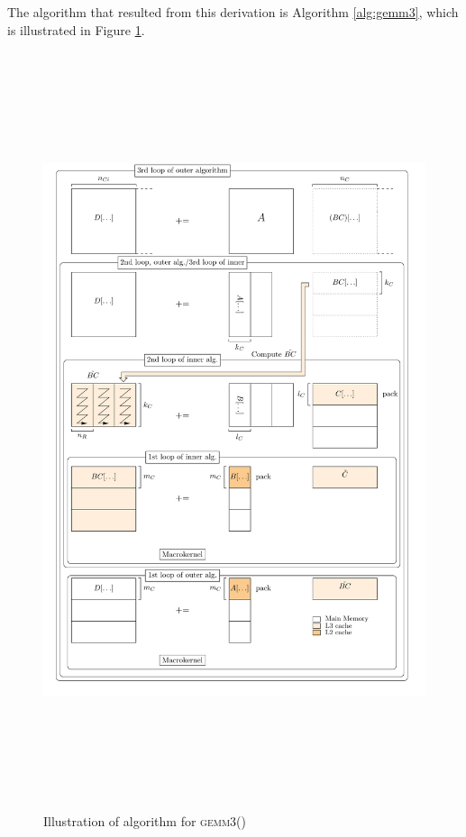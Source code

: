 \documentclass[12pt]{article}
\newcommand*{\gemmt}{{\textsc{gemm3()}}}
\begin{document}
The algorithm that resulted from this derivation is Algorithm \ref{alg:gemm3}, which is illustrated in Figure \ref{fig:gemm3}.

\begin{figure}
  \centering
  \includegraphics[height=8.75in]{gemm3-picture}
  \caption{Illustration of algorithm for \gemmt{}}
  \label{fig:gemm3}
\end{figure}
\end{document}
